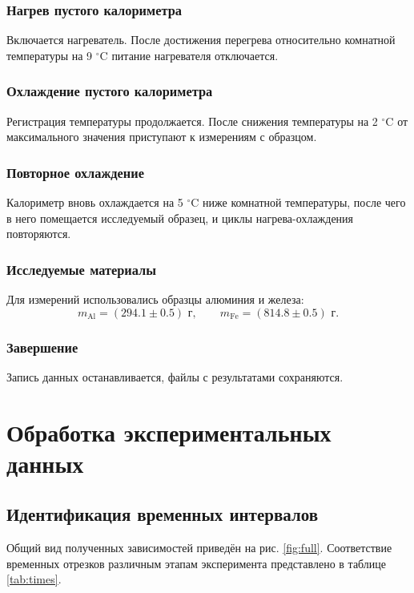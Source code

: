 \documentclass[a4paper,12pt]{article}
\begin{document}
\subsubsection{Нагрев пустого калориметра}
Включается нагреватель. После достижения перегрева относительно комнатной температуры на 9 $^\circ$C питание нагревателя отключается.

\subsubsection{Охлаждение пустого калориметра}
Регистрация температуры продолжается. После снижения температуры на 2 $^\circ$C от максимального значения приступают к измерениям с образцом.

\subsubsection{Повторное охлаждение}
Калориметр вновь охлаждается на 5 $^\circ$C ниже комнатной температуры, после чего в него помещается исследуемый образец, и циклы нагрева-охлаждения повторяются.

\subsubsection{Исследуемые материалы}
Для измерений использовались образцы алюминия и железа:
\begin{equation}
    m_{\text{Al}} = (294.1 \pm 0.5) \text{ г}, \qquad m_{\text{Fe}} = (814.8 \pm 0.5) \text{ г}.
\end{equation}

\subsubsection{Завершение}
Запись данных останавливается, файлы с результатами сохраняются.

\section{Обработка экспериментальных данных}

\subsection{Идентификация временных интервалов}
Общий вид полученных зависимостей приведён на рис. \ref{fig:full}. Соответствие временных отрезков различным этапам эксперимента представлено в таблице \ref{tab:times}.
\end{document}
